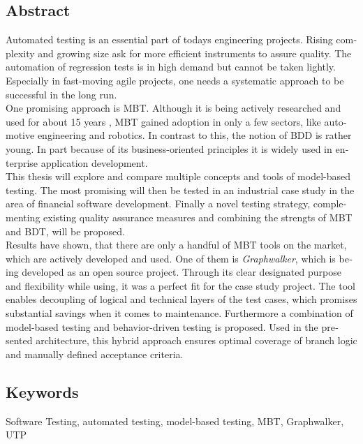 \glsresetall
\begin{otherlanguage}{english}

  \chapter*{Abstract}

  Automated testing is an essential part of todays engineering projects. Rising complexity and growing size ask for more efficient instruments to assure quality. The automation of regression tests is in high demand but cannot be taken lightly. Especially in fast-moving agile projects, one needs a systematic approach to be successful in the long run.\\

  One promising approach is \Gls{MBT}. Although it is being actively researched and used for about 15 years \cite{utting_practical_2007}, \Gls{MBT} gained adoption in only a few sectors, like automotive engineering and robotics. In contrast to this, the notion of \Gls{BDD} is rather young. In part because of its business-oriented principles it is widely used in enterprise application development.\\

  This thesis will explore and compare multiple concepts and tools of model-based testing. The most promising will then be tested in an industrial case study in the area of financial software development. Finally a novel testing strategy, complementing existing quality assurance measures and combining the strengts of \Gls{MBT} and \Gls{BDT}, will be proposed.\\

  Results have shown, that there are only a handful of \Gls{MBT} tools on the market, which are actively developed and used. One of them is \textit{Graphwalker}, which is being developed as an open source project. Through its clear designated purpose and flexibility while using, it was a perfect fit for the case study project. The tool enables decoupling of logical and technical layers of the test cases, which promises substantial savings when it comes to maintenance. Furthermore a combination of model-based testing and behavior-driven testing is proposed. Used in the presented architecture, this hybrid approach ensures optimal coverage of branch logic and manually defined acceptance criteria.

  \bigskip

  \section*{Keywords}
  Software Testing, automated testing, model-based testing, MBT, Graphwalker, UTP

\end{otherlanguage}






















